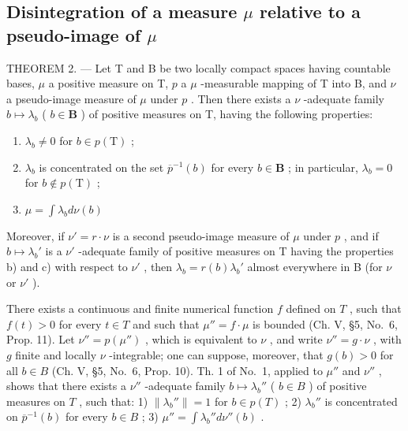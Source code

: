 \subsection{\texorpdfstring{Disintegration of a measure \(\mu\) relative to a pseudo-image of \(\mu\)}{Disintegration of a measure mu relative to a pseudo-image of mu}}

THEOREM 2. --- Let T and B be two locally compact spaces having countable bases, \(\mu\) a positive measure on T, \(p\) a \(\mu\) -measurable mapping of T into B, and \(\nu\) a pseudo-image measure of \(\mu\) under \(p\) . Then there exists a \(\nu\) -adequate family \(b \mapsto \lambda_b\) ( \(b \in \mathbf{B}\) ) of positive measures on T, having the following properties:

\begin{enumerate}
\def\labelenumi{\alph{enumi})}
\item
  \(\lambda_{b} \neq 0\) for \(b \in p(\mathrm{T})\) ;
\item
  \(\lambda_{b}\) is concentrated on the set \(\overline{p}^{-1}(b)\) for every \(b\in \mathbf{B}\) ; in particular, \(\lambda_{b} = 0\) for \(b\notin p(\mathrm{T})\) ;
\item
  \(\mu = \int \lambda_b d\nu(b)\)
\end{enumerate}

Moreover, if \(\nu' = r \cdot \nu\) is a second pseudo-image measure of \(\mu\) under \(p\) , and if \(b \mapsto \lambda_b'\) is a \(\nu'\) -adequate family of positive measures on T having the properties b) and c) with respect to \(\nu'\) , then \(\lambda_b = r(b)\lambda_b'\) almost everywhere in B (for \(\nu\) or \(\nu'\) ).

There exists a continuous and finite numerical function \(f\) defined on \(T\) , such that \(f(t) > 0\) for every \(t \in T\) and such that \(\mu'' = f \cdot \mu\) is bounded (Ch. V, §5, No.~6, Prop. 11). Let \(\nu'' = p(\mu'')\) , which is equivalent to \(\nu\) , and write \(\nu'' = g \cdot \nu\) , with \(g\) finite and locally \(\nu\) -integrable; one can suppose, moreover, that \(g(b) > 0\) for all \(b \in B\) (Ch. V, §5, No.~6, Prop. 10). Th. 1 of No.~1, applied to \(\mu''\) and \(\nu''\) , shows that there exists a \(\nu''\) -adequate family \(b \mapsto \lambda_b''\) ( \(b \in B\) ) of positive measures on \(T\) , such that: 1) \(\| \lambda_b'' \| = 1\) for \(b \in p(T)\) ; 2) \(\lambda_b''\) is concentrated on \(\overline{p}^{-1}(b)\) for every \(b \in B\) ; 3) \(\mu'' = \int \lambda_b'' d\nu''(b)\) .

